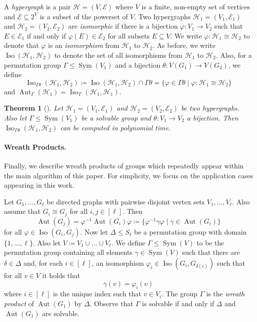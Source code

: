 \PassOptionsToPackage{dvipsnames,svgnames}{xcolor}\documentclass[10pt,a4paper]{article}
\newtheorem{theorem}{Theorem}[section]
\newcommand{\CE}{{\mathcal E}}
\newcommand{\CH}{{\mathcal H}}
\DeclareMathOperator{\Aut}{Aut}
\DeclareMathOperator{\Iso}{Iso}
\DeclareMathOperator{\Sym}{Sym}
\begin{document}
A \emph{hypergraph} is a pair $\CH = (V,\CE)$ where $V$ is a finite, non-empty set of vertices and $\CE \subseteq 2^V$ is a subset of the powerset of $V$.
Two hypergraphs $\CH_1 = (V_1,\CE_1)$ and $\CH_2 = (V_2,\CE_2)$ are \emph{isomorphic} if there is a bijection $\varphi\colon V_1 \to V_2$ such that $E \in \CE_1$ if and only if $\varphi(E) \in \CE_2$ for all subsets $E \subseteq V$.
We write $\varphi\colon \CH_1 \cong \CH_2$ to denote that $\varphi$ is an \emph{isomorphism} from $\CH_1$ to $\CH_2$.
As before, we write $\Iso(\CH_1,\CH_2)$ to denote the set of all isomorphisms from $\CH_1$ to $\CH_2$.
Also, for a permutation group $\Gamma \leq \Sym(V_1)$ and a bijection $\theta\colon V(G_1) \to V(G_2)$,
we define
\[\Iso_{\Gamma\theta}(\CH_1,\CH_2) \coloneqq \Iso(\CH_1,\CH_2) \cap \Gamma\theta = \{\varphi \in \Gamma\theta \mid \varphi\colon \CH_1 \cong \CH_2\}\]
and $\Aut_\Gamma(\CH_1) = \Iso_\Gamma(\CH_1,\CH_1)$.

\begin{theorem}[\cite{Miller83}]
 \label{thm:hi-solvable-group}
 Let $\CH_1 = (V_1,\CE_1)$ and $\CH_2 = (V_2,\CE_2)$ be two hypergraphs.
 Also let $\Gamma \leq \Sym(V_1)$ be a solvable group and $\theta\colon V_1 \to V_2$ a bijection.
 Then $\Iso_{\Gamma\theta}(\CH_1,\CH_2)$ can be computed in polynomial time.
\end{theorem}

\paragraph{Wreath Products.}

Finally, we describe wreath products of groups which repeatedly appear within the main algorithm of this paper.
For simplicity, we focus on the application cases appearing in this work.

Let $G_1,\dots,G_\ell$ be directed graphs with pairwise disjoint vertex sets $V_1,\dots,V_\ell$.
Also assume that $G_i \cong G_j$ for all $i,j \in [\ell]$.
Then
\[\Aut(G_j) = \varphi^{-1}\Aut(G_i)\varphi \coloneqq \{\varphi^{-1}\gamma\varphi \mid \gamma \in \Aut(G_i)\}\]
for all $\varphi \in \Iso(G_i,G_j)$.
Now let $\Delta \leq S_\ell$ be a permutation group with domain $\{1,\dots,\ell\}$.
Also let $V \coloneqq V_1 \cup \dots \cup V_\ell$.
We define $\Gamma \leq \Sym(V)$ to be the permutation group containing all elements $\gamma \in \Sym(V)$ such that there are $\delta \in \Delta$ and, for each $i \in [\ell]$, an isomorphism $\varphi_i \in \Iso(G_i,G_{\delta(i)})$ such that for all $v \in V$ it holds that
\[\gamma(v) = \varphi_i(v)\]
where $i \in [\ell]$ is the unique index such that $v \in V_i$.
The group $\Gamma$ is the \emph{wreath product} of $\Aut(G_1)$ by $\Delta$.
Observe that $\Gamma$ is solvable if and only if $\Delta$ and $\Aut(G_1)$ are solvable.
\end{document}
